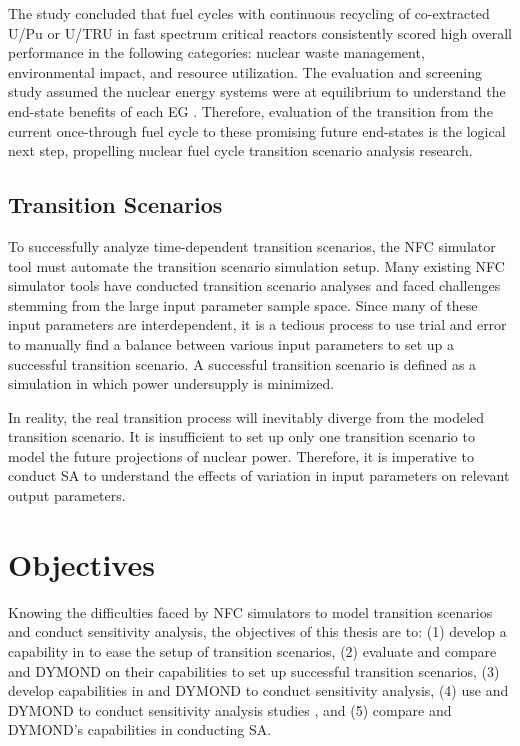 The study concluded that fuel cycles with continuous recycling
of co-extracted U/Pu or U/TRU in fast spectrum critical reactors
consistently scored high overall performance in the following 
categories: nuclear waste management, environmental impact, 
and resource utilization. 
The evaluation and screening study assumed
the nuclear energy systems were at equilibrium to understand 
the end-state benefits of each \gls{EG} \cite{feng_standardized_2016}. 
Therefore, evaluation of the transition from the current 
once-through fuel cycle to these promising 
future end-states \cite{feng_standardized_2016} 
is the logical next step, propelling 
nuclear fuel cycle transition 
scenario analysis research. 

\subsection{Transition Scenarios}
To successfully analyze time-dependent transition
scenarios, the \gls{NFC} simulator tool must 
automate the transition scenario simulation setup. 
Many existing \gls{NFC} simulator tools have conducted 
transition scenario analyses \cite{feng_standardized_2016,bae_standardized_2019,coquelet-pascal_cosi6:_2015}
and faced challenges stemming from the large input parameter
sample space.
Since many of these input parameters are interdependent, it is 
a tedious process to use trial and error to manually find a balance 
between various input parameters to set up a successful transition 
scenario. 
A successful transition scenario is defined as a simulation in which 
power undersupply is minimized. 
 
In reality, the real transition process will 
inevitably diverge from the modeled transition scenario. 
It is insufficient to set up only one transition scenario to model 
the future projections of nuclear power.
Therefore, it is imperative to conduct \gls{SA} to understand 
the effects of variation in input parameters on 
relevant output parameters. 

\section{Objectives}
Knowing the difficulties faced by \gls{NFC} simulators to model 
transition scenarios and conduct sensitivity analysis, 
the objectives of this thesis are to: 
(1) develop a capability in \Cyclus to ease the setup of 
transition scenarios, 
(2) evaluate and compare \Cyclus and 
DYMOND on their capabilities to set up 
successful transition scenarios,
(3) develop capabilities in \Cyclus and DYMOND to conduct 
sensitivity analysis,
(4) use \Cyclus and DYMOND to conduct sensitivity analysis studies
, and
(5) compare \Cyclus and DYMOND's capabilities in conducting \gls{SA}. 
